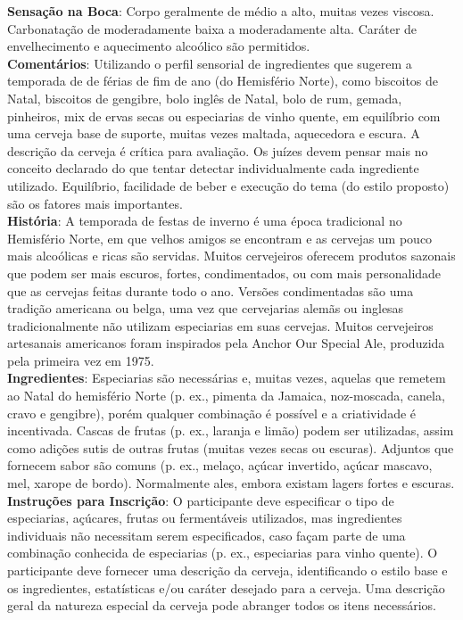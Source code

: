 \textbf{Sensação na Boca}: Corpo geralmente de médio a alto, muitas vezes viscosa. Carbonatação de moderadamente baixa a moderadamente alta. Caráter de envelhecimento e aquecimento alcoólico são permitidos. \\
\textbf{Comentários}: Utilizando o perfil sensorial de ingredientes que sugerem a temporada de de férias de fim de ano (do Hemisfério Norte), como biscoitos de Natal, biscoitos de gengibre, bolo inglês de Natal, bolo de rum, gemada, pinheiros, mix de ervas secas ou especiarias de vinho quente, em equilíbrio com uma cerveja base de suporte, muitas vezes maltada, aquecedora e escura. A descrição da cerveja é crítica para avaliação. Os juízes devem pensar mais no conceito declarado do que tentar detectar individualmente cada ingrediente utilizado. Equilíbrio, facilidade de beber e execução do tema (do estilo proposto) são os fatores mais importantes. \\
\textbf{História}: A temporada de festas de inverno é uma época tradicional no Hemisfério Norte, em que velhos amigos se encontram e as cervejas um pouco mais alcoólicas e ricas são servidas. Muitos cervejeiros oferecem produtos sazonais que podem ser mais escuros, fortes, condimentados, ou com mais personalidade que as cervejas feitas durante todo o ano. Versões condimentadas são uma tradição americana ou belga, uma vez que cervejarias alemãs ou inglesas tradicionalmente não utilizam especiarias em suas cervejas. Muitos cervejeiros artesanais americanos foram inspirados pela Anchor Our Special Ale, produzida pela primeira vez em 1975. \\
\textbf{Ingredientes}: Especiarias são necessárias e, muitas vezes, aquelas que remetem ao Natal do hemisfério Norte (p. ex., pimenta da Jamaica, noz-moscada, canela, cravo e gengibre), porém qualquer combinação é possível e a criatividade é incentivada. Cascas de frutas (p. ex., laranja e limão) podem ser utilizadas, assim como adições sutis de outras frutas (muitas vezes secas ou escuras). Adjuntos que fornecem sabor são comuns (p. ex., melaço, açúcar invertido, açúcar mascavo, mel, xarope de bordo). Normalmente ales, embora existam lagers fortes e escuras. \\
\textbf{Instruções para Inscrição}: O participante deve especificar o tipo de especiarias, açúcares, frutas ou fermentáveis utilizados, mas ingredientes individuais não necessitam serem especificados, caso façam parte de uma combinação conhecida de especiarias (p. ex., especiarias para vinho quente). O participante deve fornecer uma descrição da cerveja, identificando o estilo base e os ingredientes, estatísticas e/ou caráter desejado para a cerveja. Uma descrição geral da natureza especial da cerveja pode abranger todos os itens necessários. \\
